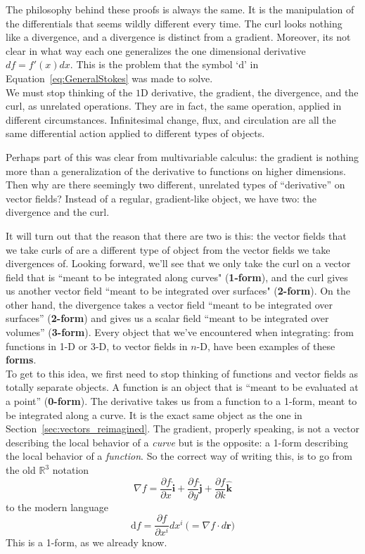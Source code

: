 	The philosophy behind these proofs is always the same. It is the manipulation of the differentials that seems wildly different every time. The curl looks nothing like a divergence, and a divergence is distinct from a gradient. Moreover, its not clear in what way each one generalizes the one dimensional derivative $df = f'(x) dx$. This is the problem that the symbol `$\mathrm d$' in Equation~\eqref{eq:GeneralStokes} was made to solve.\\
	
	We must stop thinking of the $1$D derivative, the gradient, the divergence, and the curl, as unrelated operations. They are in fact, the same operation, applied in different circumstances. Infinitesimal change, flux, and circulation are all the same differential action applied to different types of objects. 
	
	Perhaps part of this was clear from multivariable calculus: the gradient is nothing more than a generalization of the derivative to functions on higher dimensions. Then why are there seemingly two different, unrelated types of ``derivative'' on vector fields? Instead of a regular, gradient-like object, we have two: the divergence and the curl. 
	
	It will turn out that the reason that there are two is this: the vector fields that we take curls of are a different type of object from the vector fields we take divergences of. Looking forward, we'll see that we only take the curl on a vector field that is ``meant to be integrated along curves" (\textbf{1-form}), and the curl gives us another vector field ``meant to be integrated over surfaces" (\textbf{2-form}). On the other hand, the divergence takes a vector field ``meant to be integrated over surfaces'' (\textbf{2-form}) and gives us a scalar field ``meant to be integrated over volumes'' (\textbf{3-form}). Every object that we've encountered when integrating: from functions in 1-D or 3-D, to vector fields in $n$-D, have been examples of these \textbf{forms}.  \\
	
	To get to this idea, we first need to stop thinking of functions and vector fields as totally separate objects. A function is an object that is ``meant to be evaluated at a point'' (\textbf{0-form}). The derivative takes us from a function to a 1-form, meant to be integrated along a curve. It is the exact same object as the one in Section~\ref{sec:vectors_reimagined}. The gradient, properly speaking, is not a vector describing the local behavior of a \emph{curve} but is the opposite: a 1-form describing the local behavior of a \emph{function}.
	So the correct way of writing this, is to go from the old $\mathbb{R}^3$ notation
	\begin{equation*}
		\nabla f = \frac{\partial f}{\partial x} \hat{\mathbf i}
					+\frac{\partial f}{\partial y} \hat{\mathbf j}
					+\frac{\partial f}{\partial k} \hat{\mathbf k}
	\end{equation*}
	to the modern language
	\begin{equation}
		\mathrm d f  = \frac{\partial f}{\partial x^i} dx^i ~\Big(= \nabla f \cdot d \mathbf r\Big)
	\end{equation}
	This is a 1-form, as we already know.
	
